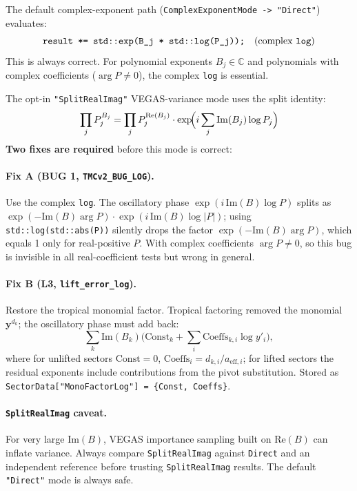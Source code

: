 \documentclass[11pt,a4paper]{article}
\begin{document}
The default complex-exponent path (\texttt{ComplexExponentMode -> "Direct"}) evaluates:
\begin{equation}
\text{\texttt{result *= std::exp(B\_j * std::log(P\_j));}} \quad (\text{complex \texttt{log}})
\end{equation}
This is always correct. For polynomial exponents $B_j\in\mathbb{C}$ and polynomials with complex coefficients ($\arg P\neq 0$), the complex \texttt{log} is essential.

The opt-in \texttt{"SplitRealImag"} VEGAS-variance mode uses the split identity:
\begin{equation}
\prod_j P_j^{B_j} = \prod_j P_j^{\mathrm{Re}(B_j)}\cdot\exp\!\Bigl(i\sum_j \mathrm{Im}(B_j)\log P_j\Bigr)
\end{equation}
\textbf{Two fixes are required} before this mode is correct:

\paragraph{Fix A (BUG 1, \texttt{TMCv2\_BUG\_LOG}).} Use the complex \texttt{log}. The oscillatory phase $\exp(i\,\mathrm{Im}(B)\log P)$ splits as $\exp(-\mathrm{Im}(B)\arg P)\cdot\exp(i\,\mathrm{Im}(B)\log|P|)$; using \texttt{std::log(std::abs(P))} silently drops the factor $\exp(-\mathrm{Im}(B)\arg P)$, which equals 1 only for real-positive $P$. With complex coefficients $\arg P\neq 0$, so this bug is invisible in all real-coefficient tests but wrong in general.

\paragraph{Fix B (L3, \texttt{lift\_error\_log}).} Restore the tropical monomial factor. Tropical factoring removed the monomial $\mathbf{y}^{d_k}$; the oscillatory phase must add back:
\begin{equation}
\sum_k\mathrm{Im}(B_k)\bigl(\mathrm{Const}_k + \sum_i\mathrm{Coeffs}_{k,i}\log y'_i\bigr),
\end{equation}
where for unlifted sectors $\mathrm{Const}=0$, $\mathrm{Coeffs}_i=d_{k,i}/a_{\mathrm{eff},i}$; for lifted sectors the residual exponents include contributions from the pivot substitution. Stored as \texttt{SectorData["MonoFactorLog"] = \{Const, Coeffs\}}.

\paragraph{\texttt{SplitRealImag} caveat.} For very large $\mathrm{Im}(B)$, VEGAS importance sampling built on $\mathrm{Re}(B)$ can inflate variance. Always compare \texttt{SplitRealImag} against \texttt{Direct} and an independent reference before trusting \texttt{SplitRealImag} results. The default \texttt{"Direct"} mode is always safe.
\end{document}
